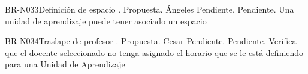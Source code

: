 \begin{BusinessRule}{BR-N033}{Definición de espacio}
	{\bcCondition}    %
	{\btEnabler}     %
	{\blControlling}    %
	.
	\BRItem[Estado] Propuesta.
	 Ángeles
	 Pendiente.
	 Pendiente.
	\BRItem[Descripción] Una unidad de aprendizaje puede tener asociado un espacio
\end{BusinessRule}

\begin{BusinessRule}{BR-N034}{Traslape de profesor}
	{\bcCondition}    %
	{\btEnabler}     %
	{\blControlling}    %
	.
	\BRItem[Estado] Propuesta.
	 Cesar
	 Pendiente.
	 Pendiente.
	\BRItem[Descripción] Verifica que el docente seleccionado no tenga asignado el horario que se le está definiendo para una Unidad de Aprendizaje
\end{BusinessRule}

